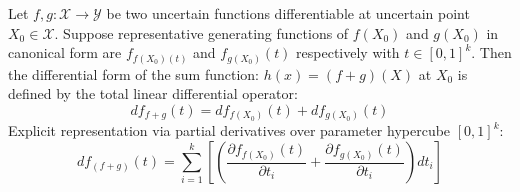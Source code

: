 \begin{theorem}
	Let $f,g : \mathcal{X} \to \mathcal{Y}$ be two uncertain functions differentiable at uncertain point $X_0 \in \mathcal{X}$. Suppose representative generating functions of $f(X_0)$ and $g(X_0)$ in canonical form are $f_{f(X_0)(t)}$ and $f_{g(X_0)}(t)$ respectively with $t \in [0,1]^k$.
	\newline
	Then the differential form of the sum function:
	$h(x) = (f+g)(X)$ at $X_0$ is defined by the total linear differential operator:
	\[df_{f+g}(t) = df_{f(X_0)}(t) + df_{g(X_0)}(t)\]
	Explicit representation via partial derivatives over parameter hypercube $[0,1]^k:$
	\[df_{\left(f+g\right)}(t) = \sum_{i=1}^{k}\left[ \left(\frac{\partial f_{f(X_0)}(t)}{\partial t_i} + \frac{\partial f_{g(X_0)}(t)}{\partial t_i}\right) dt_i\right]\]
\end{theorem}